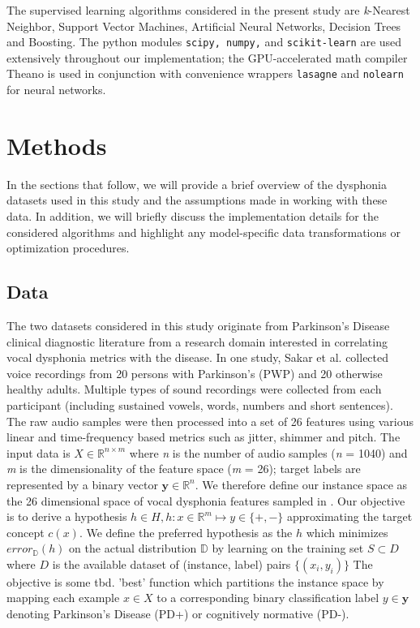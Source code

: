 \documentclass[12pt]{article}
\begin{document}
The supervised learning algorithms considered in the present study are \textit{k}-Nearest Neighbor, Support Vector Machines, Artificial Neural Networks, Decision Trees and Boosting. The python modules \texttt{scipy, numpy,} and \texttt{scikit-learn} \cite{scipy} \cite{scikit-learn} are used extensively  throughout our implementation; the GPU-accelerated math compiler Theano \cite{bergstra+al:2010-scipy} is used in conjunction with convenience wrappers \texttt{lasagne} and \texttt{nolearn} for neural networks.

\section{Methods}
\label{sec:meth}
In the sections that follow, we will provide a brief overview of the dysphonia datasets used in this study and the assumptions made in working with these data. In addition, we will briefly discuss the implementation details for the considered algorithms and highlight any model-specific data transformations or optimization procedures.

\subsection{Data}
The two datasets considered in this study originate from Parkinson's Disease clinical diagnostic literature from a research domain interested in correlating vocal dysphonia metrics with the disease. In one study, Sakar et al.\cite{Sakar2013} collected voice recordings from 20 persons with Parkinson's (PWP) and 20 otherwise healthy adults. Multiple types of sound recordings were collected from each participant (including sustained vowels, words, numbers and short sentences). The raw audio samples were then processed into a set of 26 features using various linear and time-frequency based metrics such as jitter, shimmer and pitch. The input data is $X \in \mathbb{R}^{n \times m} $ where \textit{n} is the number of audio samples (\textit{n} = 1040) and \textit{m} is the dimensionality of the feature space (\textit{m} = 26); target labels are represented by a binary vector $ \boldsymbol{y} \in \mathbb{R}^n $. We therefore define our instance space as the 26 dimensional space of vocal dysphonia features sampled in \cite{Sakar2013}. Our objective is to derive a hypothesis $h\in H, h : x \in \mathbb{R}^m \mapsto y \in \lbrace +,- \rbrace$ approximating the target concept $c(x)$. We define the preferred hypothesis as the $h$ which minimizes $error_\mathbb{D}(h)$ on the actual distribution $\mathbb{D}$ by learning on the training set $ S \subset D$ where $D$ is the available dataset of (instance, label) pairs $\lbrace (x_i,y_i) \rbrace$ The objective is some tbd. 'best' function which partitions the instance space by mapping each example $ x \in X $ to a corresponding binary classification label $ y \in \boldsymbol{y} $ denoting Parkinson's Disease (PD+) or cognitively normative (PD-).
\end{document}
